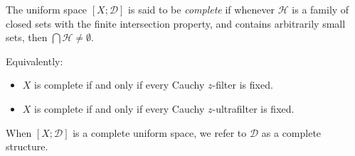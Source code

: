 The uniform space $[X; \mathcal{D}]$ is said to be \textit{complete} if whenever $\mathcal{H}$ is a family of closed sets with the finite intersection property, and contains arbitrarily small sets, then $\bigcap \mathcal{H} \neq \emptyset$.

Equivalently:
\begin{itemize}
\item[(a)] $X$ is complete if and only if every Cauchy $z$-filter is fixed.
\item[(b)] $X$ is complete if and only if every Cauchy $z$-ultrafilter is fixed.
\end{itemize}

When $[X; \mathcal{D}]$ is a complete uniform space, we refer to $\mathcal{D}$ as a complete structure.
